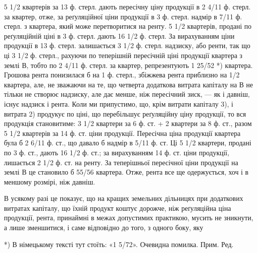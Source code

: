 5 1/2 квартерів за 13 ф. стерл. дають пересічну ціну продукції в 2 4/11 ф. стерл.
за квартер, отже, за реґуляційної ціни продукції в 3 ф. стерл. надмір
в 7/11 ф. стерл. з квартера, який може перетворитися на ренту. 5 1/2 квартерів,
продані по реґуляційній ціні в 3 ф. стерл. дають 16 1/2 ф. стерл. За вирахуванням
ціни продукції в 13 ф. стерл. залишається 3 1/2 ф. стерл. надзиску, або
ренти, так що ці 3 1/2 ф. стерл., рахуючи по теперішній пересічній ціні продукції
квартера з землі В, тобто по 2 4/11 ф. стерл. за квартер, репрезентують
1 25/52 *) квартера. Грошова рента понизилася б на 1 ф. стерл., збіжжева
рента приблизно на 1/2 квартера, але, не зважаючи на те, що четверта додаткова
витрата капіталу на В не тільки не створює надзиску, але дає менше, ніж
пересічний зиск, — як і давніш, існує надзиск і рента. Коли ми припустимо, що,
крім витрати капіталу 3), і витрата 2) продукує по ціні, що перебільшує реґуляційну
ціну продукції, то вся продукція становитиме: 3 1/2 квартери за
6 ф. ст. + 2 квартери за 8 ф. ст., разом 5 1/2 квартерів за 14 ф. ст. ціни продукції.
Пересічна ціна продукції квартера була б 2 6/11  ф. ст., що давало б надмір
в 5/11 ф. ст. Ці  5 1/2  квартери, продані по 3 ф. ст., дають 16 1/2 ф. ст.; за вирахуванням
14 ф. ст. ціни продукції, лишається 2 1/2 ф. ст. на ренту. За теперішньої
пересічної ціни продукції на землі В це становило б 55/56 квартера. Отже, рента
все ще одержується, хоч і в меншому розмірі, ніж давніш.

В усякому разі це показує, що на кращих земельних дільницях при додаткових
витратах капіталу, що їхній продукт коштує дорожче, ніж реґуляційна
ціна продукції, рента, принаймні в межах допустимих практикою, мусить не
зникнути, а лише зменшитися, і саме відповідно до того, з одного боку, яку

*) В німецькому тексті тут стоїть: «1 5/72». Очевидна помилка. Прим. Ред.

